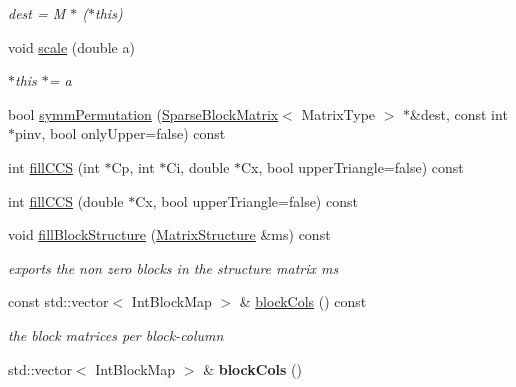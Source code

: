 \begin{DoxyCompactItemize}
\begin{DoxyCompactList}\small\item\em dest = M $\ast$ ($\ast$this) \end{DoxyCompactList}\item 
\hypertarget{classg2o_1_1SparseBlockMatrix_afbccb3c0404beeba566e21429089e288}{void \hyperlink{classg2o_1_1SparseBlockMatrix_afbccb3c0404beeba566e21429089e288}{scale} (double a)}\label{classg2o_1_1SparseBlockMatrix_afbccb3c0404beeba566e21429089e288}

\begin{DoxyCompactList}\small\item\em $\ast$this $\ast$= a \end{DoxyCompactList}\item 
bool \hyperlink{classg2o_1_1SparseBlockMatrix_a19b0010ec521b275bc88fda5c66b1b48}{symm\-Permutation} (\hyperlink{classg2o_1_1SparseBlockMatrix}{Sparse\-Block\-Matrix}$<$ Matrix\-Type $>$ $\ast$\&dest, const int $\ast$pinv, bool only\-Upper=false) const 
\item 
int \hyperlink{classg2o_1_1SparseBlockMatrix_a71b97c895688e06ab48eaf53c93c39ed}{fill\-C\-C\-S} (int $\ast$Cp, int $\ast$Ci, double $\ast$Cx, bool upper\-Triangle=false) const 
\item 
int \hyperlink{classg2o_1_1SparseBlockMatrix_a77bf1e20da0968a5ad55d590406700a7}{fill\-C\-C\-S} (double $\ast$Cx, bool upper\-Triangle=false) const 
\item 
\hypertarget{classg2o_1_1SparseBlockMatrix_a7c9f06c801b5421752673b349477f617}{void \hyperlink{classg2o_1_1SparseBlockMatrix_a7c9f06c801b5421752673b349477f617}{fill\-Block\-Structure} (\hyperlink{classg2o_1_1MatrixStructure}{Matrix\-Structure} \&ms) const }\label{classg2o_1_1SparseBlockMatrix_a7c9f06c801b5421752673b349477f617}

\begin{DoxyCompactList}\small\item\em exports the non zero blocks in the structure matrix ms \end{DoxyCompactList}\item 
\hypertarget{classg2o_1_1SparseBlockMatrix_a8e53797223fff106487d0b0080a3e36e}{const std\-::vector$<$ Int\-Block\-Map $>$ \& \hyperlink{classg2o_1_1SparseBlockMatrix_a8e53797223fff106487d0b0080a3e36e}{block\-Cols} () const }\label{classg2o_1_1SparseBlockMatrix_a8e53797223fff106487d0b0080a3e36e}

\begin{DoxyCompactList}\small\item\em the block matrices per block-\/column \end{DoxyCompactList}\item 
\hypertarget{classg2o_1_1SparseBlockMatrix_a31236f3e11cb7af4979d68fdba3d5e33}{std\-::vector$<$ Int\-Block\-Map $>$ \& {\bfseries block\-Cols} ()}\label{classg2o_1_1SparseBlockMatrix_a31236f3e11cb7af4979d68fdba3d5e33}


\end{DoxyCompactItemize}
